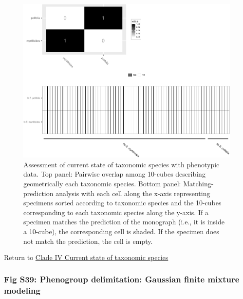 \documentclass[
  11pt,
]{article}
\begin{document}
\begin{figure}
\includegraphics{Supplementary_Material_files/figure-latex/currentStateOfTaxonomyCladeIVPlots-1} \caption{Assessment of current state of taxonomic species with phenotypic data. Top panel: Pairwise overlap among 10-cubes describing geometrically each taxonomic species. Bottom panel: Matching-prediction analysis with each cell along the x-axis representing specimens sorted according to taxonomic species and the 10-cubes corresponding to each taxonomic species along the y-axis. If a specimen matches the prediction of the monograph (i.e., it is inside a 10-cube), the corresponding cell is shaded. If the specimen does not match the prediction, the cell is empty.}\label{fig:currentStateOfTaxonomyCladeIVPlots}
\end{figure}

Return to \protect\hyperlink{current-state-of-taxonomic-species-3}{Clade IV Current state of taxonomic species}
\pagebreak

\hypertarget{fig-s39-phenogroup-delimitation-gaussian-finite-mixture-modeling}{%
\subsubsection{Fig S39: Phenogroup delimitation: Gaussian finite mixture modeling}\label{fig-s39-phenogroup-delimitation-gaussian-finite-mixture-modeling}}
\end{document}
